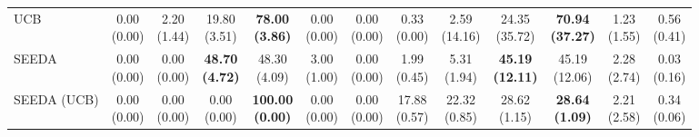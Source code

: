 \begin{table}[H]
{\begin{tabular}{l|cccccc|cccccc}
UCB & \makecell{0.00 \\ (0.00)} & \makecell{2.20 \\ (1.44)} & {\cellcolor[HTML]{C8E6C9}} \makecell{19.80 \\ (3.51)} & \bfseries \makecell{78.00 \\ (3.86)} & \makecell{0.00 \\ (0.00)} & \makecell{0.00 \\ (0.00)} & \makecell{0.33 \\ (0.00)} & \makecell{2.59 \\ (14.16)} & {\cellcolor[HTML]{C8E6C9}} \makecell{24.35 \\ (35.72)} & \bfseries \makecell{70.94 \\ (37.27)} & \makecell{1.23 \\ (1.55)} & \makecell{0.56 \\ (0.41)} \\
SEEDA & \makecell{0.00 \\ (0.00)} & \makecell{0.00 \\ (0.00)} & {\cellcolor[HTML]{C8E6C9}} \bfseries \makecell{48.70 \\ (4.72)} & \makecell{48.30 \\ (4.09)} & \makecell{3.00 \\ (1.00)} & \makecell{0.00 \\ (0.00)} & \makecell{1.99 \\ (0.45)} & \makecell{5.31 \\ (1.94)} & {\cellcolor[HTML]{C8E6C9}} \bfseries \makecell{45.19 \\ (12.11)} & \makecell{45.19 \\ (12.06)} & \makecell{2.28 \\ (2.74)} & \makecell{0.03 \\ (0.16)} \\
SEEDA (UCB) & \makecell{0.00 \\ (0.00)} & \makecell{0.00 \\ (0.00)} & {\cellcolor[HTML]{C8E6C9}} \makecell{0.00 \\ (0.00)} & \bfseries \makecell{100.00 \\ (0.00)} & \makecell{0.00 \\ (0.00)} & \makecell{0.00 \\ (0.00)} & \makecell{17.88 \\ (0.57)} & \makecell{22.32 \\ (0.85)} & {\cellcolor[HTML]{C8E6C9}} \makecell{28.62 \\ (1.15)} & \bfseries \makecell{28.64 \\ (1.09)} & \makecell{2.21 \\ (2.58)} & \makecell{0.34 \\ (0.06)} \\

\end{tabular}}
\end{table}
